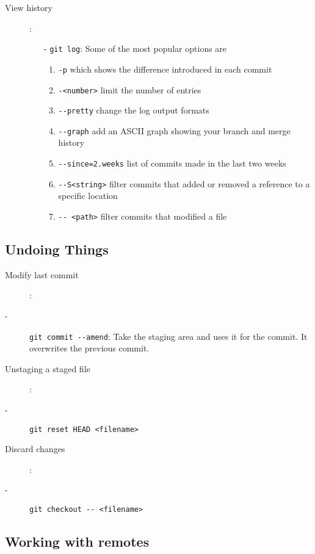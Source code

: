 \documentclass[french]{article}
\begin{document}
\begin{description}
    \item[View history]:
        \begin{enumerate}
            \item[-] \lstinline{git log}: Some of the most popular options are
                \begin{enumerate}
                    \item \lstinline{-p} which shows the difference introduced in each commit
                    \item \lstinline{-<number>} limit the number of entries
                    \item \lstinline{--pretty} change the log output formats
                    \item \lstinline{--graph} add an ASCII graph showing your branch and merge history
                    \item \lstinline{--since=2.weeks} list of commits made in the last two weeks
                    \item \lstinline{--S<string>} filter commits that added or removed a reference to a specific location
                    \item \lstinline{-- <path>} filter commits that modified a file
                \end{enumerate}
        \end{enumerate}
\end{description}

\subsection{Undoing Things}

\begin{description}
    \item[Modify last commit]:
        \item[-] \lstinline{git commit --amend}: Take the staging area and uses it for the commit. It overwrites the previous commit.
    \item[Unstaging a staged file]:
        \item[-] \lstinline{git reset HEAD <filename>}
    \item[Discard changes]:
        \item[-] \lstinline{git checkout -- <filename>}
\end{description}

\subsection{Working with remotes}
\end{document}
